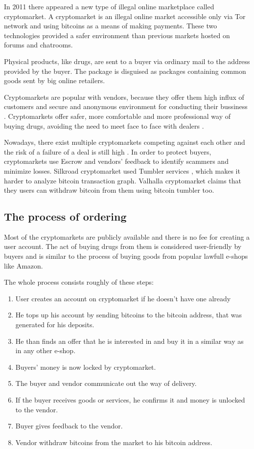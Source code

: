 \documentclass[
  digital, %
  table,   %
  lof,     %
  lot,     %
  oneside
]{fithesis3}
\begin{document}
In 2011 there appeared a new type of illegal online marketplace called cryptomarket. 
A cryptomarket is an illegal online market accessible only via Tor network and using bitcoins
as a means of making payments. These two technologies provided a safer environment
than previous markets hosted on forums and chatrooms.

Physical products, like drugs, are sent to a buyer via ordinary mail to the address provided by the buyer.
The package is disguised as packages containing common goods sent by big online retailers.
\parencite{paquet2017cryptomarkets}

Cryptomarkets are popular with vendors,
because they offer them high influx of customers and secure and anonymous environment for conducting their bussiness \parencite{van2014responsible}.
Cryptomarkets offer safer, more comfortable and more professional way of buying drugs, avoiding 
the need to meet face to face with dealers \parencite{barratt2014use}.

Nowadays, there exist multiple cryptomarkets competing against each other and the risk
of a failure of a deal is still high \parencite{wehinger2011dark}.
In order to protect buyers, cryptomarkets use Escrow and vendors' feedback to identify scammers and minimize losses.
Silkroad cryptomarket used Tumbler services \parencite{ron2014did},
which makes it harder to analyze bitcoin transaction graph. Valhalla cryptomarket claims that they
users can withdraw bitcoin from them using bitcoin tumbler too.

\subsection{The process of ordering}
Most of the cryptomarkets are publicly available and there is no fee
for creating a user account. The act of buying drugs from them is considered user-friendly by buyers and is similar
to the process of buying goods from popular lawfull e-shops like Amazon.

 The whole process consists roughly of these steps:
\begin{enumerate}
\item User creates an account on cryptomarket if he doesn't have one already
\item He tops up his account by sending bitcoins to the bitcoin address,
that was generated for his deposits.
\item He than finds an offer that he is interested in and buy it in a similar
way as in any other e-shop.
\item Buyers' money is now locked by cryptomarket.
\item The buyer and vendor communicate out the way of delivery.
\item If the buyer receives goods or services, he confirms it and money is unlocked to the vendor.
\item Buyer gives feedback to the vendor. 
\item Vendor withdraw bitcoins from the market to his bitcoin address.
\end{enumerate}
\end{document}
